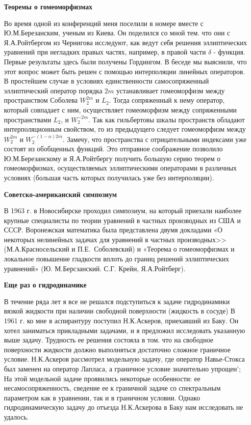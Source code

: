 {\bf Теоремы о гомеоморфизмах}

Во время одной из конференций меня поселили в номере вместе с Ю.М.Березанским, ученым из Киева. Он поделился со мной тем. что они с Я.А.Ройтбергом из Чернигова исследуют, как ведут себя решения эллиптических уравнений при негладких правых частях, например, в правой части $\delta$ - функция. Первые результаты здесь были получены Гордингом. В беседе мы выяснили, что этот вопрос может быть решен с помощью интерполяции линейных операторов. В простейшем случае в условиях единственности самосопряженный эллиптический оператор порядка $2m$ устанавливает гомеоморфизм между пространством Соболева $W_2^{2m}$ и $L_2$. Тогда сопряженный к нему оператор, который совпадает с ним, осуществляет гомеоморфизм между сопряженными пространствами $L_2$, и $W_2^{-2m}$. Так как гильбертовы шкалы пространств обладают интерполяционным свойством, го из предыдущего следует гомеоморфизм между $W_2^{2m}$ и $W_2^{-(1-\alpha)2m}$. Замечу, что пространства с отрицательными индексами уже состоят из обобщенных функций. Это отправное соображение позволило Ю.М.Березанскому и Я.А.Ройтбергу получить большую серию теорем о гомеоморфизмах, осуществляемых эллиптическими операторами в различных условиях (большая часть которых получилась уже без интерполяции).

{\bf Советско-американский симпозиум}

В 1963 г. в Новосибирске проходил симпозиум,
на который приехали наиболее крупные специалисты по теории уравнений в частных производных из США и СССР.
Воронежская математика была представлена двумя докладами «О некоторых нелинейных задачах для уравнений в частных производных>>
(М.А.Красносельский и П.Е.~Соболевский) и «Теорема о гомеоморфизмах и локальное повышение гладкости вплоть до границ решений эллиптических уравнений» (Ю. М.Берсзанский. С.Г. Крейн, Я.А.Ройтберг).

{\bf Еще раз о гидродинамике}

В течение ряда лет я все не решался подступиться к задаче гидродинамики вязкой жидкости при наличии свободной поверхности (жидкость в сосуде) В 1961 г. ко мне в аспирантуру поступил Н.К.Аскеров, приехавший из Баку. Он хотел заниматься прикладными задачами, и я предложил исследовать указанную выше задачу. Трудность ее решения состояла в том. что на свободное поверхности жидкости должно выполняться достаточно сложное граничное условие. Н.К.Аскеров рассмотрел модельную задачу, где оператор Навье-Стокса был заменен на оператор Лапласа, а граничное условие значительно упрощен'; На этой модельной задаче проявились некоторые особенности: ее несамосопряженность, сведение ее к граничной задаче со спектральным параметром как в уравнении, так и в граничном условии. Однако гидродинамическую задачу до отъезда Н.К.Аскерова в Баку нам исследовать не удалось.

